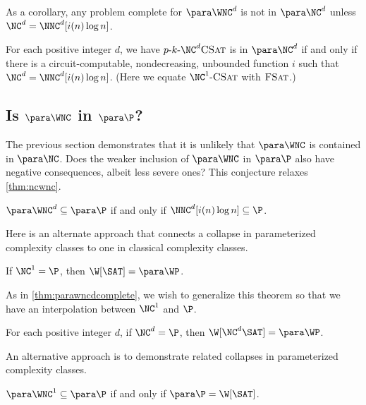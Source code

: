 \documentclass{article}
\newcommand{\dash}{\textnormal{-}}
\newcommand{\pNCSAT}{p \dash k \dash \NC^d \textsc{CSat}}
\begin{document}
As a corollary, any problem complete for $\para \WNC^d$ is not in $\para \NC^d$ unless $\NC^d = \NNC^d[i(n) \log n]$.

\begin{corollary}
  For each positive integer $d$, we have $\pNCSAT$ is in $\para \NC^d$ if and only if there is a circuit-computable, nondecreasing, unbounded function $i$ such that $\NC^d = \NNC^d[i(n) \log n]$.
  (Here we equate $\NC^1 \dash \textsc{CSat}$ with $\textsc{FSat}$.)
\end{corollary}

\subsection{Is \texorpdfstring{$\para \WNC$}{paraWNC} in \texorpdfstring{$\para \P$}{paraP}?}
\label{sec:wncp}

The previous section demonstrates that it is unlikely that $\para \WNC$ is contained in $\para \NC$.
Does the weaker inclusion of $\para \WNC$ in $\para \P$ also have negative consequences, albeit less severe ones?
This conjecture relaxes \autoref{thm:ncwnc}.

\begin{conjecture}\label{con:wncp}
  $\para \WNC^d \subseteq \para \P$ if and only if $\NNC^d[i(n) \log n] \subseteq \P$.
\end{conjecture}

Here is an alternate approach that connects a collapse in parameterized complexity classes to one in classical complexity classes.

\begin{theorem}
  If $\NC^1 = \P$, then $\W[\SAT] = \para \WP$.
\end{theorem}

As in \autoref{thm:parawncdcomplete}, we wish to generalize this theorem so that we have an interpolation between $\NC^1$ and $\P$.

\begin{conjecture}
  For each positive integer $d$, if $\NC^d = \P$, then $\W[\NC^d \SAT] = \para \WP$.
\end{conjecture}

An alternative approach is to demonstrate related collapses in parameterized complexity classes.

\begin{theorem}
  $\para \WNC^1 \subseteq \para \P$ if and only if $\para \P = \W[\SAT]$.
\end{theorem}
\end{document}
